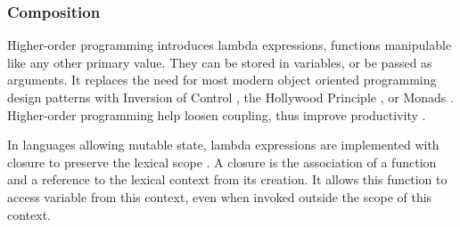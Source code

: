 \subsubsection{Composition} \label{chapter3:definitions:productivity:composition}

Higher-order programming introduces lambda expressions, functions manipulable like any other primary value.
They can be stored in variables, or be passed as arguments.
It replaces the need for most modern object oriented programming design patterns  with Inversion of Control \cite{Johnson}, the Hollywood Principle \cite{Sweet1985}, or Monads \cite{Wadler1992}.
Higher-order programming help loosen coupling, thus improve productivity \cite{Haynes1984}.

In languages allowing mutable state, lambda expressions are implemented with closure to preserve the lexical scope \cite{Sussman1998}.
A closure is the association of a function and a reference to the lexical context from its creation.
It allows this function to access variable from this context, even when invoked outside the scope of this context.


